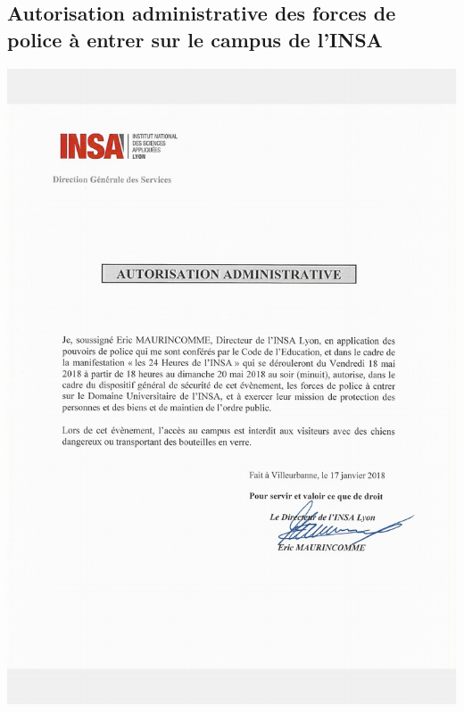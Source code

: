 \documentclass[hidelinks, paper=a4, fontsize=13pt]{report}
\begin{document}
\subsection{Autorisation administrative des forces de police à entrer sur le campus de l’INSA}
\begin{center}
\includegraphics[scale=0.7]{Annexes/Documents/INSAAutorisationPolice}
\end{center}
\end{document}

